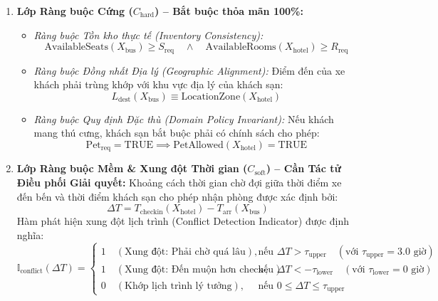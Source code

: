 \begin{enumerate}
    \item \textbf{Lớp Ràng buộc Cứng ($C_{\text{hard}}$) -- Bắt buộc thỏa mãn 100\%:}
    \begin{itemize}
        \item \textit{Ràng buộc Tồn kho thực tế (Inventory Consistency):}
        \begin{equation}
        \text{AvailableSeats}(X_{\text{bus}}) \ge S_{\text{req}} \quad \land \quad \text{AvailableRooms}(X_{\text{hotel}}) \ge R_{\text{req}}
        \end{equation}
        \item \textit{Ràng buộc Đồng nhất Địa lý (Geographic Alignment):} Điểm đến của xe khách phải trùng khớp với khu vực địa lý của khách sạn:
        \begin{equation}
        L_{\text{dest}}(X_{\text{bus}}) \equiv \text{LocationZone}(X_{\text{hotel}})
        \end{equation}
        \item \textit{Ràng buộc Quy định Đặc thù (Domain Policy Invariant):} Nếu khách mang thú cưng, khách sạn bắt buộc phải có chính sách cho phép:
        \begin{equation}
        \text{Pet}_{\text{req}} = \text{TRUE} \implies \text{PetAllowed}(X_{\text{hotel}}) = \text{TRUE}
        \end{equation}
    \end{itemize}

    \item \textbf{Lớp Ràng buộc Mềm \& Xung đột Thời gian ($C_{\text{soft}}$) -- Cần Tác tử Điều phối Giải quyết:}
    Khoảng cách thời gian chờ đợi giữa thời điểm xe đến bến và thời điểm khách sạn cho phép nhận phòng được xác định bởi:
    \begin{equation}
    \Delta T = T_{\text{checkin}}(X_{\text{hotel}}) - T_{\text{arr}}(X_{\text{bus}})
    \end{equation}
    Hàm phát hiện xung đột lịch trình (Conflict Detection Indicator) được định nghĩa:
    \begin{equation}
    \mathbb{I}_{\text{conflict}}(\Delta T) = 
    \begin{cases}
    1 \quad (\text{Xung đột: Phải chờ quá lâu}), & \text{nếu } \Delta T > \tau_{\text{upper}} \quad (\text{với } \tau_{\text{upper}} = 3.0\text{ giờ}) \\
    1 \quad (\text{Xung đột: Đến muộn hơn check-in}), & \text{nếu } \Delta T < -\tau_{\text{lower}} \quad (\text{với } \tau_{\text{lower}} = 0\text{ giờ}) \\
    0 \quad (\text{Khớp lịch trình lý tưởng}), & \text{nếu } 0 \le \Delta T \le \tau_{\text{upper}}
    \end{cases}
    \end{equation}
\end{enumerate}

